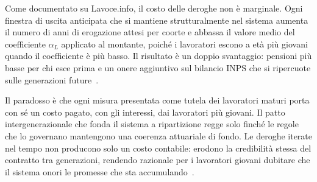 Come documentato su Lavoce.info, il costo delle deroghe non è marginale. Ogni finestra di uscita anticipata che si mantiene strutturalmente nel sistema aumenta il numero di anni di erogazione attesi per coorte e abbassa il valore medio del coefficiente \(\alpha_L\) applicato al montante, poiché i lavoratori escono a età più giovani quando il coefficiente è più basso. Il risultato è un doppio svantaggio: pensioni più basse per chi esce prima e un onere aggiuntivo sul bilancio INPS che si ripercuote sulle generazioni future~\cite{LavoceRiformaDini, MEF_RGS2025}.

Il paradosso è che ogni misura presentata come tutela dei lavoratori maturi porta con sé un costo pagato, con gli interessi, dai lavoratori più giovani. Il patto intergenerazionale che fonda il sistema a ripartizione regge solo finché le regole che lo governano mantengono una coerenza attuariale di fondo. Le deroghe iterate nel tempo non producono solo un costo contabile: erodono la credibilità stessa del contratto tra generazioni, rendendo razionale per i lavoratori giovani dubitare che il sistema onori le promesse che sta accumulando~\cite{Bosi2018, MEF_RGS2025}.